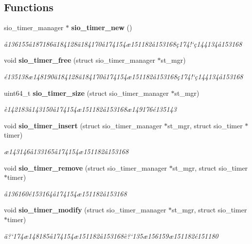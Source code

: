 \subsection*{Functions}
\begin{CompactItemize}
\item 
sio\_\-timer\_\-manager $\ast$ {\bf sio\_\-timer\_\-new} ()
\begin{CompactList}\small\item\em \aa{}136155\aa{}187186\"{a}184128\"{a}184170\aa{}174154\ae{}151182\aa{}153168\c{c}174!`\c{c}144134\aa{}153168 \item\end{CompactList}\item 
void {\bf sio\_\-timer\_\-free} (struct sio\_\-timer\_\-manager $\ast$st\_\-mgr)
\begin{CompactList}\small\item\em \'{e}135138\ae{}148190\"{a}184128\"{a}184170\aa{}174154\ae{}151182\aa{}153168\c{c}174!`\c{c}144134\aa{}153168 \item\end{CompactList}\item 
uint64\_\-t {\bf sio\_\-timer\_\-size} (struct sio\_\-timer\_\-manager $\ast$st\_\-mgr)
\begin{CompactList}\small\item\em \`{e}142183\aa{}143150\aa{}174154\ae{}151182\aa{}153168\ae{}149176\'{e}135143 \item\end{CompactList}\item 
void {\bf sio\_\-timer\_\-insert} (struct sio\_\-timer\_\-manager $\ast$st\_\-mgr, struct sio\_\-timer $\ast$timer)
\begin{CompactList}\small\item\em \ae{}143146\aa{}133165\aa{}174154\ae{}151182\aa{}153168 \item\end{CompactList}\item 
void {\bf sio\_\-timer\_\-remove} (struct sio\_\-timer\_\-manager $\ast$st\_\-mgr, struct sio\_\-timer $\ast$timer)
\begin{CompactList}\small\item\em \aa{}136160\'{e}153164\aa{}174154\ae{}151182\aa{}153168 \item\end{CompactList}\item 
void {\bf sio\_\-timer\_\-modify} (struct sio\_\-timer\_\-manager $\ast$st\_\-mgr, struct sio\_\-timer $\ast$timer)
\begin{CompactList}\small\item\em \"{a}?`174\ae{}148185\aa{}174154\ae{}151182\aa{}153168\`{e}?`135\ae{}156159\ae{}151182\'{e}151180 \item\end{CompactList}\item 

\end{CompactItemize}
